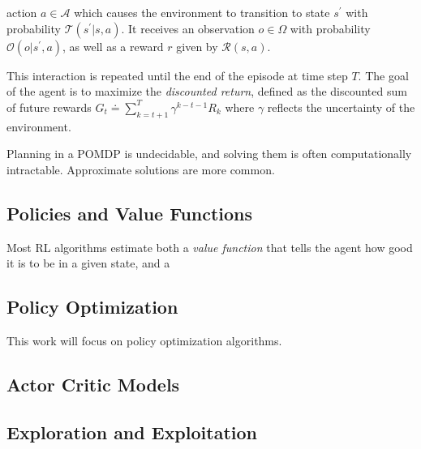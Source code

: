 action \(a \in \mathcal{A}\) which causes the environment to transition to state \(s^\prime\) with probability \(\mathcal{T}(s^\prime | s, a)\).
It receives an observation \(o \in \Omega\) with probability \(\mathcal{O}(o | s^\prime, a)\), as well as a reward \(r\) given by \(\mathcal{R}(s, a)\).

This interaction is repeated until the end of the episode at time step \(T\). The goal of the agent is to maximize the \textit{discounted return}, defined as the discounted sum of future rewards \(G_t \doteq \sum_{k=t+1}^T \gamma^{k-t-1} R_{k}\) where \(\gamma\) reflects the uncertainty of the environment.


Planning in a POMDP is undecidable, and solving them is often computationally intractable. Approximate solutions are more common.


\subsection{Policies and Value Functions}

Most RL algorithms estimate both a \textit{value function} that tells the agent how good it is to be in a given state, and a 


\subsection{Policy Optimization}

This work will focus on policy optimization algorithms.

\subsection{Actor Critic Models}

\subsection{Exploration and Exploitation}

% 


